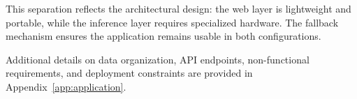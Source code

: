\noindent This separation reflects the architectural design: the web layer is lightweight and portable, while the inference layer requires specialized hardware. The fallback mechanism ensures the application remains usable in both configurations.

Additional details on data organization, API endpoints, non-functional requirements, and deployment constraints are provided in Appendix~\ref{app:application}.
